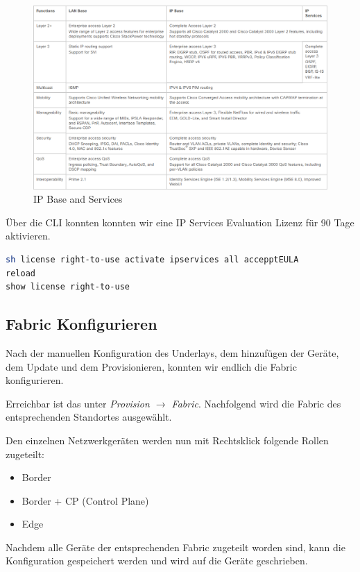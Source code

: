 \begin{figure}[H]
	\centering
	\includegraphics[width=16cm]{img/IPBaseServices.png}
	\caption{IP Base and Services}
	\label{fig:IP Base and Services}
\end{figure}

Über die CLI konnten konnten wir eine IP Services Evaluation Lizenz für 90 Tage aktivieren.

\begin{lstlisting}[language=bash]
sh license right-to-use activate ipservices all accepptEULA
reload
show license right-to-use
\end{lstlisting}

\subsection{Fabric Konfigurieren}
Nach der manuellen Konfiguration des Underlays, dem hinzufügen der Geräte, dem Update und dem Provisionieren, konnten wir endlich die Fabric konfigurieren. 

Erreichbar ist das unter \textit{Provision $\rightarrow$ Fabric}. Nachfolgend wird die Fabric des entsprechenden Standortes ausgewählt.

Den einzelnen Netzwerkgeräten werden nun mit Rechtsklick folgende Rollen zugeteilt:
\begin{itemize}
	\item Border
	\item Border + CP (Control Plane)
	\item Edge
\end{itemize}

Nachdem alle Geräte der entsprechenden Fabric zugeteilt worden sind, kann die Konfiguration gespeichert werden und wird auf die Geräte geschrieben. 

